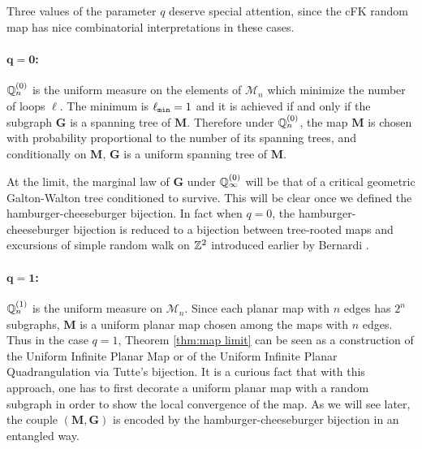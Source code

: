 \documentclass[a4paper]{article}
\newcommand*{\map}{\mathbf}
\newcommand*{\M}{\mathcal{M}}
\begin{document}
Three values of the parameter $q$ deserve special attention, since the cFK random map has nice combinatorial interpretations in these cases.

\vspace{-1ex}
\paragraph{$\mathbf{q=0}$:}
$\proba[Q]\ind{0}_n$ is the uniform measure on the elements of $\M_n$ which minimize the number of loops $\ell$.
The minimum is $\ell\sub{min}=1$ and it is achieved if and only if the subgraph $\map{G}$ is a spanning tree of $\map{M}$.
Therefore under $\proba[Q]\ind{0}_n$, the map $\map{M}$ is chosen with probability proportional to the number of its spanning trees, and conditionally on $\map{M}$, $\map{G}$ is a uniform spanning tree of $\map{M}$.

At the limit, the marginal law of $\map{G}$ under $\proba[Q]\ind{0}_\infty$ will be that of a critical geometric Galton-Walton tree conditioned to survive.
This will be clear once we defined the hamburger-cheeseburger bijection.
In fact when $q=0$, the hamburger-cheeseburger bijection is reduced to a bijection between tree-rooted maps and excursions of simple random walk on $\integer^2$ introduced earlier by Bernardi \cite{Ber07}.

\vspace{-1ex}
\paragraph{$\mathbf{q=1}$:}
$\proba[Q]\ind{1}_n$ is the uniform measure on $\M_n$.
Since each planar map with $n$ edges has $2^n$ subgraphs, $\map{M}$ is a uniform planar map chosen among the maps with $n$ edges.
Thus in the case $q=1$, Theorem \ref{thm:map limit} can be seen as a construction of the Uniform Infinite Planar Map or of the Uniform Infinite Planar Quadrangulation via Tutte's bijection.
It is a curious fact that with this approach, one has to first decorate a uniform planar map with a random subgraph in order to show the local convergence of the map.
As we will see later, the couple $(\map{M,G})$ is encoded by the hamburger-cheeseburger bijection in an entangled way.

\vspace{-1ex}
\end{document}
